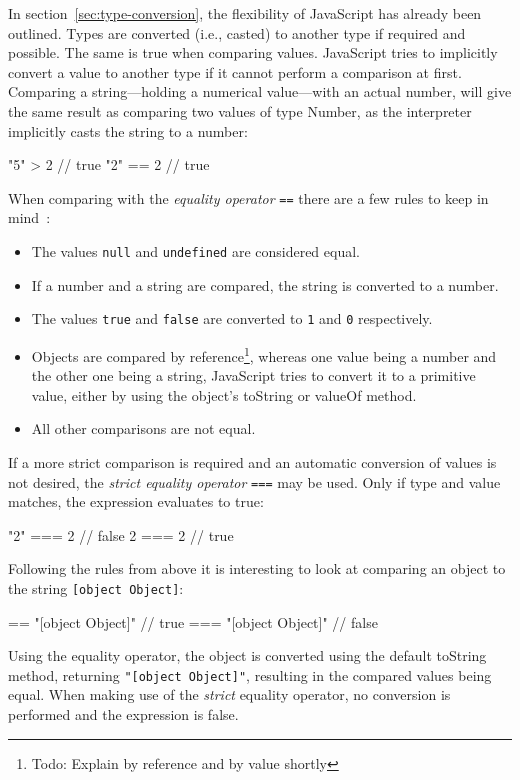 In section~\ref{sec:type-conversion}, the flexibility of JavaScript has already been outlined. Types are converted (i.e., casted) to another type if required and possible.  The same is true when comparing values. JavaScript tries to implicitly convert a value to another type if it cannot perform a comparison at first. Comparing a string---holding a numerical value---with an actual number, will give the same result as comparing two values of type Number, as the interpreter implicitly casts the string to a number:
\begin{JsCode}[numbers=none]
"5" > 2 // true
"2" == 2 // true
\end{JsCode}
When comparing with the \emph{equality operator} \texttt{==} there are a few rules to keep in mind~\cite[~p.~72]{JavaScriptTheDefinitiveGuide:Flanagan:2011}:
\begin{itemize}
  \item The values \texttt{null} and \texttt{undefined} are considered equal.
  \item If a number and a string are compared, the string is converted to a number.
  \item The values \texttt{true} and \texttt{false} are converted to \texttt{1} and \texttt{0} respectively.
  \item Objects are compared by reference\footnote{Todo: Explain by reference and by value shortly}, whereas one value being a number and the other one being a string, JavaScript tries to convert it to a primitive value, either by using the object's toString or valueOf method.
  \item All other comparisons are not equal.
\end{itemize}
If a more strict comparison is required and an automatic conversion of values is not desired, the \emph{strict equality operator} \texttt{===} may be used. Only if type and value matches, the expression evaluates to true:
\begin{JsCode}[numbers=none]
"2" === 2 // false
2 === 2   // true
\end{JsCode}
Following the rules from above it is interesting to look at comparing an object to the string \texttt{[object Object]}:
\begin{JsCode}[numbers=none]
{} == "[object Object]"  // true
{} === "[object Object]" // false
\end{JsCode}
Using the equality operator, the object is converted using the default toString method, returning \texttt{"[object Object]"}, resulting in the compared values being equal. When making use of the \emph{strict} equality operator, no conversion is performed and the expression is false.

